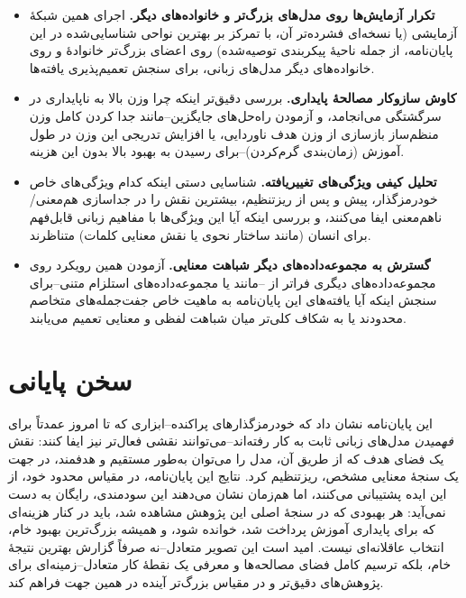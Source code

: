 \begin{itemize}
\item \textbf{تکرار آزمایش‌ها روی مدل‌های بزرگ‌تر و خانواده‌های دیگر.} اجرای همین شبکهٔ آزمایشی (یا نسخه‌ای فشرده‌تر آن، با تمرکز بر بهترین نواحی شناسایی‌شده در این پایان‌نامه، از جمله ناحیهٔ پیکربندی توصیه‌شده) روی اعضای بزرگ‌تر خانوادهٔ
و روی خانواده‌های دیگر مدل‌های زبانی، برای سنجش تعمیم‌پذیری یافته‌ها.
\item \textbf{کاوش سازوکار مصالحهٔ پایداری.} بررسی دقیق‌تر اینکه چرا وزن بالا به ناپایداری در سرگشتگی می‌انجامد، و آزمودن راه‌حل‌های جایگزین--مانند جدا کردن کامل وزن منظم‌ساز بازسازی از وزن هدف ناوردایی، یا افزایش تدریجی این وزن در طول آموزش (زمان‌بندی گرم‌کردن)--برای رسیدن به بهبود بالا بدون این هزینه.
\item \textbf{تحلیل کیفی ویژگی‌های تغییریافته.} شناسایی دستی اینکه کدام ویژگی‌های خاص خودرمزگذار، پیش و پس از ریزتنظیم، بیشترین نقش را در جداسازی هم‌معنی/ناهم‌معنی ایفا می‌کنند، و بررسی اینکه آیا این ویژگی‌ها با مفاهیم زبانی قابل‌فهم برای انسان (مانند ساختار نحوی یا نقش معنایی کلمات) متناظرند.
\item \textbf{گسترش به مجموعه‌داده‌های دیگر شباهت معنایی.} آزمودن همین رویکرد روی مجموعه‌داده‌های دیگری فراتر از
--مانند
یا مجموعه‌داده‌های استلزام متنی--برای سنجش اینکه آیا یافته‌های این پایان‌نامه به ماهیت خاص جفت‌جمله‌های متخاصم
محدودند یا به شکاف کلی‌تر میان شباهت لفظی و معنایی تعمیم می‌یابند.
\end{itemize}

\section{سخن پایانی}
این پایان‌نامه نشان داد که خودرمزگذارهای پراکنده--ابزاری که تا امروز عمدتاً برای \emph{فهمیدن} مدل‌های زبانی ثابت به کار رفته‌اند--می‌توانند نقشی فعال‌تر نیز ایفا کنند: نقش یک فضای هدف که از طریق آن، مدل را می‌توان به‌طور مستقیم و هدفمند، در جهت یک سنجهٔ معنایی مشخص، ریزتنظیم کرد. نتایج این پایان‌نامه، در مقیاس محدود خود، از این ایده پشتیبانی می‌کنند، اما هم‌زمان نشان می‌دهند این سودمندی، رایگان به دست نمی‌آید: هر بهبودی که در سنجهٔ اصلی این پژوهش مشاهده شد، باید در کنار هزینه‌ای که برای پایداری آموزش پرداخت شد، خوانده شود، و همیشه بزرگ‌ترین بهبود خام، انتخاب عاقلانه‌ای نیست. امید است این تصویر متعادل--نه صرفاً گزارش بهترین نتیجهٔ خام، بلکه ترسیم کامل فضای مصالحه‌ها و معرفی یک نقطهٔ کار متعادل--زمینه‌ای برای پژوهش‌های دقیق‌تر و در مقیاس بزرگ‌تر آینده در همین جهت فراهم کند.
